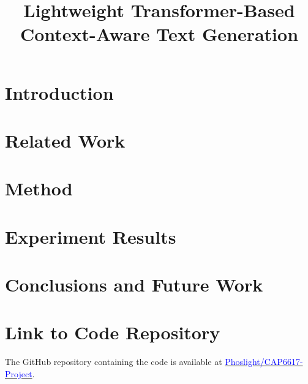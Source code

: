 \documentclass[conference]{IEEEtran}
\begin{document}
\title{Lightweight Transformer-Based Context-Aware Text Generation}


\author{
\and
{}
}

\maketitle

\section{Introduction}\label{sec:introduction}


\section{Related Work}\label{sec:related-work}


\section{Method}\label{sec:method}


\section{Experiment Results}\label{sec:experiment-results}



\section{Conclusions and Future Work}\label{sec:conclusions-and-future-work}



%


\appendices
\section{Link to Code Repository}\label{sec:appendix-code}
The GitHub repository containing the code is available at
\href{https://github.com/Phoslight/CAP6617-Project}{\textcolor{blue}{Phoslight/CAP6617-Project}}.
\end{document}

